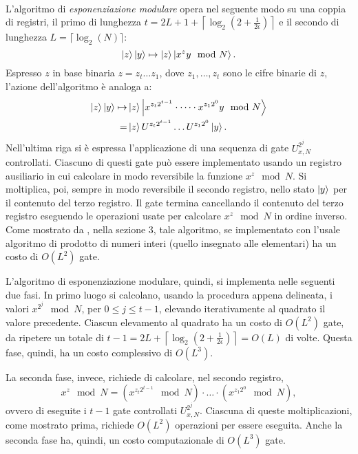 \begin{algo}\label{algo:modular_exponentiation}\ \\
 L'algoritmo di \textit{esponenziazione modulare} opera nel seguente modo su una coppia di registri, il primo di lunghezza $t = 2L + 1 + \left\lceil \log_2\left(2 + \frac{1}{2\epsilon}\right)\right\rceil$ e il secondo di lunghezza $L = \lceil\log_2(N)\rceil$:
 \begin{equation}
  \ket{z}\ket{y} \mapsto \ket{z}\ket{x^zy \mod N}.
 \end{equation}
 Espresso $z$ in base binaria $z = z_t\dots z_1$, dove $z_1, \dots, z_t$ sono le cifre binarie di $z$, l'azione dell'algoritmo è analoga a:
 \begin{align}
  \ket{z}\ket{y} \mapsto& \ket{z}\ket{x^{z_t2^{t-1}}\cdot \dots \cdot x^{z_1 2^0} y \mod N}\\
  =& \ket{z} U^{z_t2^{t-1}} \dots U^{z_1 2^0}\ket{y}.
 \end{align}
 Nell'ultima riga si è espressa l'applicazione di una sequenza di gate $U_{x,N}^{2^j}$ controllati.
 Ciascuno di questi gate può essere implementato usando un registro ausiliario in cui calcolare in modo reversibile la funzione $x^z \mod N$.
 Si moltiplica, poi, sempre in modo reversibile il secondo registro, nello stato $\ket{y}$ per il contenuto del terzo registro.
 Il gate termina cancellando il contenuto del terzo registro eseguendo le operazioni usate per calcolare $x^z \mod N$ in ordine inverso.
 Come mostrato da \cite{Article:Shor:1997}, nella sezione 3, tale algoritmo, se implementato con l'usale algoritmo di prodotto di numeri interi (quello insegnato alle elementari) ha un costo di $O(L^2)$ gate.
 
 L'algoritmo di esponenziazione modulare, quindi, si implementa nelle seguenti due fasi.
 In primo luogo si calcolano, usando la procedura appena delineata, i valori $x^{2^j} \mod N$, per $0 \leq j \leq t-1$, elevando iterativamente al quadrato il valore precedente. Ciascun elevamento al quadrato ha un costo di $O(L^2)$ gate, da ripetere un totale di $t-1 = 2L +  \left\lceil \log_2\left(2 + \frac{1}{2\epsilon}\right)\right\rceil = O(L)$ di volte. Questa fase, quindi, ha un costo complessivo di $O(L^3)$.
 
 La seconda fase, invece, richiede di calcolare, nel secondo registro,
 \begin{equation}
  x^z \mod N = \left(x^{z_t2^{t-1}} \mod N\right)\cdot \dots \cdot \left(x^{z_1 2^0} \mod N \right),
 \end{equation}
 ovvero di eseguite i $t-1$ gate controllati $U_{x,N}^{2^j}$.
 Ciascuna di queste moltiplicazioni, come mostrato prima, richiede $O(L^2)$ operazioni per essere eseguita. Anche la seconda fase ha, quindi, un costo computazionale di $O(L^3)$ gate.
 

\end{algo}
